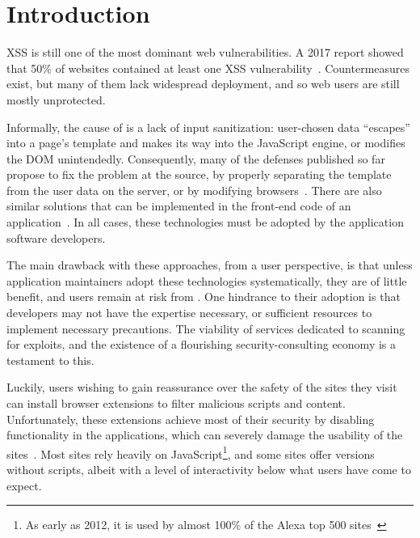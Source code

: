 \section{Introduction} \label{introduction}

\ac{XSS} is still one of the most dominant web vulnerabilities. A 2017
report showed that 50\% of websites contained at least one \ac{XSS}
vulnerability~\cite{Acunetix}. Countermeasures exist, but many of them
lack widespread deployment, and so web users are still mostly
unprotected.

Informally, the cause of \xss is a lack of input sanitization:
user-chosen data ``escapes'' into a page's template and makes its way
into the JavaScript engine, or modifies the DOM
unintendedly.
%
Consequently, many of the \xss defenses published so far
propose to fix the problem at the source, by properly separating the
template from the user data on the server, or by modifying
browsers~\cite{Jim:2007:DSI:1242572.1242654,Nadji:2009,Wurzinger:2009:SMX:1656360.1656379,Sundareswaran:2012:XHS:2352970.2352994}.
%
There are also similar solutions that can be implemented in the
front-end code of an application~\cite{10.1007/978-3-319-66399-9_7}.
In all cases, these technologies must be adopted by the application
software developers.

The main drawback with these approaches, from a user perspective, is
that unless application maintainers adopt these technologies
systematically, they are of little benefit, and users remain at risk
from \xss. One hindrance to their adoption is that developers may not have the
expertise necessary, or sufficient resources to implement necessary
precautions.
The viability of services dedicated to scanning for exploits,
and the existence of a flourishing security-consulting economy is a testament
to this.


Luckily, users wishing to gain reassurance over the safety of the
sites they visit can install browser extensions to filter malicious
scripts and content. Unfortunately, these extensions achieve most of
their security by disabling functionality in the applications, which
can severely damage the usability of the
sites~\cite{Noscript,Snyder:2017:MWD:3133956.3133966}. Most sites rely
heavily on JavaScript\footnote{As early as 2012, it is used by almost
  100\% of the Alexa top 500
  sites~\cite{Stock:2017:WTI:3241189.3241265}}, and some sites offer
versions without scripts, albeit with a level of interactivity below
what users have come to expect.

